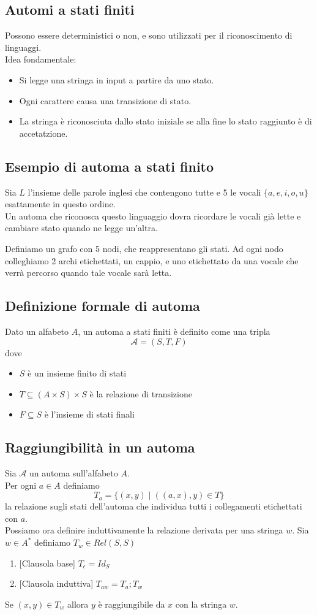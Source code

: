 \documentclass{article}
\begin{document}
\subsection{Automi a stati finiti}
Possono essere deterministici o non, e sono utilizzati per il riconoscimento di linguaggi. \\
Idea fondamentale:
\begin{itemize}
    \item Si legge una stringa in input a partire da uno stato.
    \item Ogni carattere causa una transizione di stato.
    \item La stringa è riconosciuta dallo stato iniziale se alla fine lo stato raggiunto è di accetatzione.
\end{itemize}
\subsection*{Esempio di automa a stati finito}
\begin{eg}
    Sia \(L\) l'insieme delle parole inglesi che contengono tutte e 5 le vocali \(\{a,e,i,o,u\}\) esattamente in questo ordine. \\
    Un automa che riconosca questo linguaggio dovra ricordare le vocali già lette e cambiare stato quando ne legge un'altra.

    Definiamo un grafo con 5 nodi, che reappresentano gli stati. Ad ogni nodo colleghiamo 2 archi etichettati, un cappio, e uno etichettato da una vocale che verrà percorso quando tale vocale sarà letta.
\end{eg}
\subsection*{Definizione formale di automa}
Dato un alfabeto \(A\), un automa a stati finiti è definito come una tripla
\[\mathcal{A} = (S,T,F)\]
dove
\begin{itemize}
    \item \(S\) è un insieme finito di stati
    \item \(T \subseteq (A \times S) \times S\) è la relazione di transizione
    \item \(F \subseteq S\) è l'insieme di stati finali
\end{itemize}
\subsection*{Raggiungibilità in un automa}
Sia \(\mathcal{A}\) un automa sull'alfabeto \(A\). \\
Per ogni \(a \in A\) definiamo
\[T_a = \{(x,y) \mid ((a, x), y) \in T\}\]
la relazione sugli stati dell'automa che individua tutti i collegamenti etichettati con \(a\). \\
Possiamo ora definire induttivamente la relazione derivata per una stringa \(w\). Sia \(w \in A^*\) definiamo \(T_w \in Rel(S,S)\)
\begin{enumerate}
    \item {[Clausola base]} \(T_\epsilon = Id_S\)
    \item {[Clausola induttiva]} \(T_{aw} = T_a;T_w\)
\end{enumerate}
Se \((x,y) \in T_w\) allora \(y\) è raggiungibile da \(x\) con la stringa \(w\).
\end{document}
